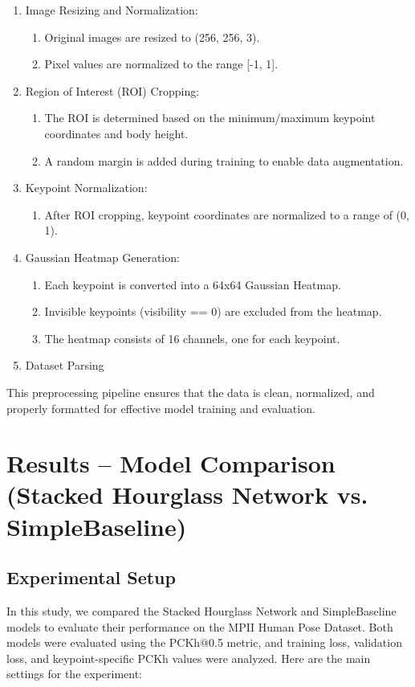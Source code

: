 \documentclass{article}
\begin{document}
\begin{enumerate}
    \item Image Resizing and Normalization:
    \begin{enumerate}
        \item Original images are resized to (256, 256, 3).
        \item Pixel values are normalized to the range [-1, 1].
    \end{enumerate}
    \item Region of Interest (ROI) Cropping:
    \begin{enumerate}
        \item The ROI is determined based on the minimum/maximum keypoint coordinates and body height.
        \item A random margin is added during training to enable data augmentation.
    \end{enumerate}
    \item Keypoint Normalization:
    \begin{enumerate}
        \item After ROI cropping, keypoint coordinates are normalized to a range of (0, 1).
    \end{enumerate}
    \item Gaussian Heatmap Generation:
    \begin{enumerate}
        \item Each keypoint is converted into a 64x64 Gaussian Heatmap.
        \item Invisible keypoints (visibility == 0) are excluded from the heatmap.
        \item The heatmap consists of 16 channels, one for each keypoint.
    \end{enumerate}
    \item Dataset Parsing
    \end{enumerate}

This preprocessing pipeline ensures that the data is clean, normalized, and properly formatted for effective model training and evaluation.

\section{Results – Model Comparison (Stacked Hourglass Network vs. SimpleBaseline)}

\subsection{Experimental Setup}
In this study, we compared the Stacked Hourglass Network and SimpleBaseline models to evaluate their performance on the MPII Human Pose Dataset. Both models were evaluated using the PCKh@0.5 metric, and training loss, validation loss, and keypoint-specific PCKh values were analyzed.
Here are the main settings for the experiment:
\end{document}
